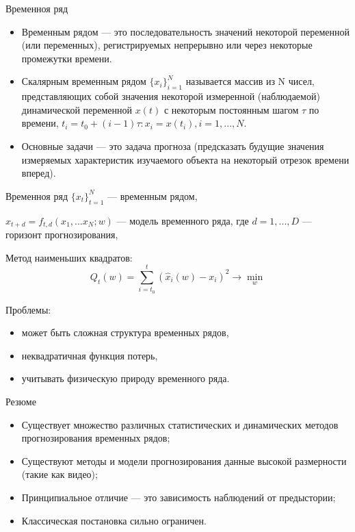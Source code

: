 \begin{frame}{Временноя ряд}
\begin{itemize}
    \item Временным рядом --- это последовательность значений некоторой переменной (или переменных), регистрируемых непрерывно или через некоторые промежутки времени.
    
    \item Скалярным временным рядом $\{x_i\}_{i=1}^{N}$ называется массив из N чисел, представляющих собой значения некоторой измеренной (наблюдаемой) динамической переменной $x(t)$ с некоторым постоянным шагом $\tau$ по времени, $t_i = t_0 + (i - 1)\tau : x_i = x(t_i), i = 1,..., N$.

    \item Основные задачи --- это задача прогноза (предсказать будущие значения измеряемых характеристик изучаемого объекта на некоторый отрезок времени вперед).
\end{itemize}
\end{frame}
\begin{frame}{Временноя ряд}
$\{x_t\}_{t=1}^{N}$ --- временным рядом,

$\hat{x}_{t+d} = f_{t,d}(x_1,...x_N;w)$ --- модель временного ряда, где $d =1,...,D$ --- горизонт прогнозирования,

Метод наименьших квадратов:
    \begin{equation*}
        Q_t(w) = \sum_{i = t_0}^{t}(\hat{x}_{i}(w) - x_i)^2 \rightarrow \min_w
    \end{equation*}

Проблемы:
\begin{itemize}
    \item может быть сложная структура временных рядов,
    \item неквадратичная функция потерь,
    \item учитывать физическую природу временного ряда.
\end{itemize}
\end{frame}
\begin{frame}{Резюме}
    \begin{itemize}
    	\item Существует множество различных статистических и динамических методов прогнозирования временных рядов;
        \item Существуют методы и модели прогнозирования данные высокой размерности (такие как видео);
        \item Принципиальное отличие --- это зависимость наблюдений от предыстории;
        \item Классическая постановка сильно ограничен.
    \end{itemize}
\end{frame}

 